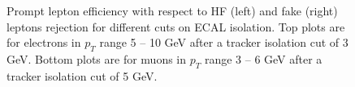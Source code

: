 \documentclass{cmspaper}
\begin{document}
\begin{figure}[htbp]
\begin{center}
   \caption{\small{\label{fig:trackCut_bkgdRej_sigEff_ptCut0_ptCut1}
      Prompt lepton efficiency with respect to HF (left) and fake (right) leptons rejection
      for different cuts on ECAL isolation. Top plots are for electrons in $p_T$ range 5 -- 10 GeV after a
      tracker isolation cut of 3 GeV. Bottom plots are for  muons in $p_T$ range 3 -- 6 GeV after a tracker
      isolation cut of 5 GeV.}}
\end{center}
\end{figure}

%

\end{document}
